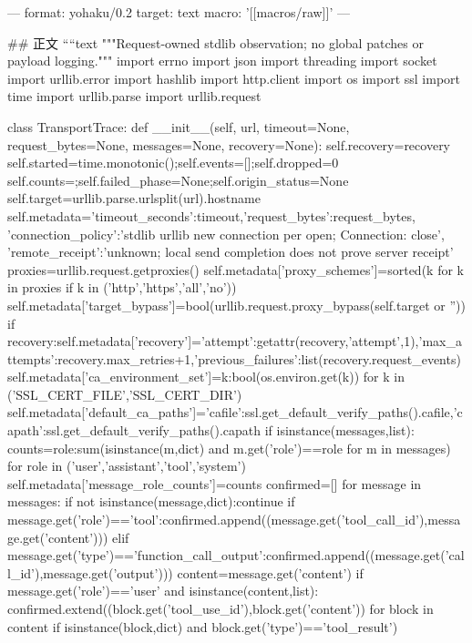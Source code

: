 ---
format: yohaku/0.2
target: text
macro: '[[macros/raw]]'
---

## 正文
````text
"""Request-owned stdlib observation; no global patches or payload logging."""
import errno
import json
import threading
import socket
import urllib.error
import hashlib
import http.client
import os
import ssl
import time
import urllib.parse
import urllib.request

class TransportTrace:
    def __init__(self, url, timeout=None, request_bytes=None, messages=None, recovery=None):
        self.recovery=recovery
        self.started=time.monotonic();self.events=[];self.dropped=0
        self.counts={};self.failed_phase=None;self.origin_status=None
        self.target=urllib.parse.urlsplit(url).hostname
        self.metadata={'timeout_seconds':timeout,'request_bytes':request_bytes,
            'connection_policy':'stdlib urllib new connection per open; Connection: close',
            'remote_receipt':'unknown; local send completion does not prove server receipt'}
        proxies=urllib.request.getproxies()
        self.metadata['proxy_schemes']=sorted(k for k in proxies if k in ('http','https','all','no'))
        self.metadata['target_bypass']=bool(urllib.request.proxy_bypass(self.target or ''))
        if recovery:self.metadata['recovery']={'attempt':getattr(recovery,'attempt',1),'max_attempts':recovery.max_retries+1,'previous_failures':list(recovery.request_events)}
        self.metadata['ca_environment_set']={k:bool(os.environ.get(k)) for k in ('SSL_CERT_FILE','SSL_CERT_DIR')}
        self.metadata['default_ca_paths']={'cafile':ssl.get_default_verify_paths().cafile,'capath':ssl.get_default_verify_paths().capath}
        if isinstance(messages,list):
            counts={role:sum(isinstance(m,dict) and m.get('role')==role for m in messages) for role in ('user','assistant','tool','system')}
            self.metadata['message_role_counts']=counts
            confirmed=[]
            for message in messages:
                if not isinstance(message,dict):continue
                if message.get('role')=='tool':confirmed.append((message.get('tool_call_id'),message.get('content')))
                elif message.get('type')=='function_call_output':confirmed.append((message.get('call_id'),message.get('output')))
                content=message.get('content')
                if message.get('role')=='user' and isinstance(content,list):
                    confirmed.extend((block.get('tool_use_id'),block.get('content')) for block in content
                        if isinstance(block,dict) and block.get('type')=='tool_result')
